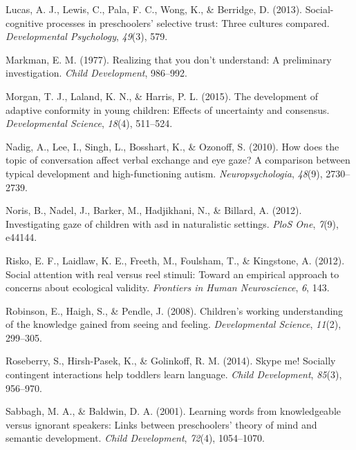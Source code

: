 \documentclass[,man,floatsintext]{apa6}
\begin{document}
\leavevmode\hypertarget{ref-lucas2013social}{}%
Lucas, A. J., Lewis, C., Pala, F. C., Wong, K., \& Berridge, D. (2013). Social-cognitive processes in preschoolers' selective trust: Three cultures compared. \emph{Developmental Psychology}, \emph{49}(3), 579.

\leavevmode\hypertarget{ref-markman1977realizing}{}%
Markman, E. M. (1977). Realizing that you don't understand: A preliminary investigation. \emph{Child Development}, 986--992.

\leavevmode\hypertarget{ref-morgan2015development}{}%
Morgan, T. J., Laland, K. N., \& Harris, P. L. (2015). The development of adaptive conformity in young children: Effects of uncertainty and consensus. \emph{Developmental Science}, \emph{18}(4), 511--524.

\leavevmode\hypertarget{ref-nadig2010does}{}%
Nadig, A., Lee, I., Singh, L., Bosshart, K., \& Ozonoff, S. (2010). How does the topic of conversation affect verbal exchange and eye gaze? A comparison between typical development and high-functioning autism. \emph{Neuropsychologia}, \emph{48}(9), 2730--2739.

\leavevmode\hypertarget{ref-noris2012investigating}{}%
Noris, B., Nadel, J., Barker, M., Hadjikhani, N., \& Billard, A. (2012). Investigating gaze of children with asd in naturalistic settings. \emph{PloS One}, \emph{7}(9), e44144.

\leavevmode\hypertarget{ref-risko2012social}{}%
Risko, E. F., Laidlaw, K. E., Freeth, M., Foulsham, T., \& Kingstone, A. (2012). Social attention with real versus reel stimuli: Toward an empirical approach to concerns about ecological validity. \emph{Frontiers in Human Neuroscience}, \emph{6}, 143.

\leavevmode\hypertarget{ref-robinson2008children}{}%
Robinson, E., Haigh, S., \& Pendle, J. (2008). Children's working understanding of the knowledge gained from seeing and feeling. \emph{Developmental Science}, \emph{11}(2), 299--305.

\leavevmode\hypertarget{ref-roseberry2014skype}{}%
Roseberry, S., Hirsh-Pasek, K., \& Golinkoff, R. M. (2014). Skype me! Socially contingent interactions help toddlers learn language. \emph{Child Development}, \emph{85}(3), 956--970.

\leavevmode\hypertarget{ref-sabbagh2001learning}{}%
Sabbagh, M. A., \& Baldwin, D. A. (2001). Learning words from knowledgeable versus ignorant speakers: Links between preschoolers' theory of mind and semantic development. \emph{Child Development}, \emph{72}(4), 1054--1070.
\end{document}
